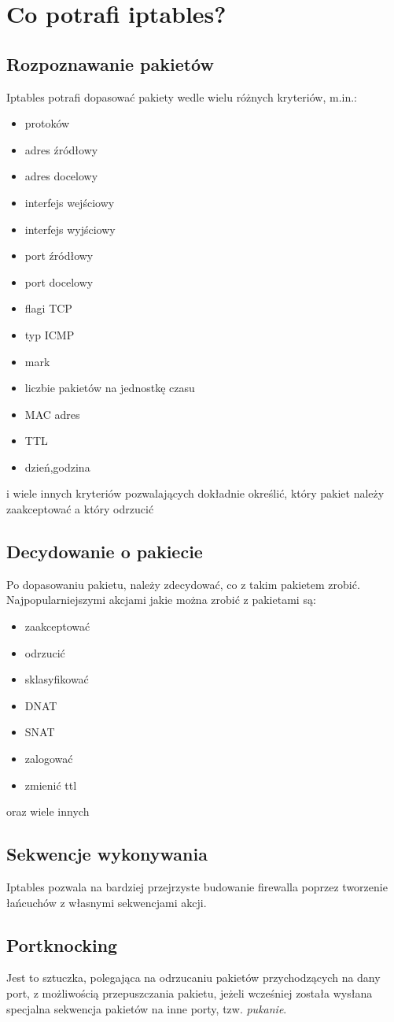 \documentclass[a4paper,12pt]{article}
\begin{document}
\section{Co potrafi iptables?}
\subsection{Rozpoznawanie pakietów}
Iptables potrafi dopasować pakiety wedle wielu różnych kryteriów, m.in.:
\begin{itemize}
\item protoków
\item adres źródłowy
\item adres docelowy
\item interfejs wejściowy
\item interfejs wyjściowy
\item port źródłowy
\item port docelowy
\item flagi TCP
\item typ ICMP
\item mark
\item liczbie pakietów na jednostkę czasu
\item MAC adres
\item TTL
\item dzień,godzina
\end{itemize}
i wiele innych kryteriów pozwalających dokładnie określić, który pakiet należy zaakceptować a który odrzucić
\subsection{Decydowanie o pakiecie}
Po dopasowaniu pakietu, należy zdecydować, co z takim pakietem zrobić. Najpopularniejszymi akcjami jakie można zrobić z pakietami są:
\begin{itemize}
\item zaakceptować
\item odrzucić
\item sklasyfikować
\item DNAT
\item SNAT
\item zalogować
\item zmienić ttl
\end{itemize}
oraz wiele innych
\subsection{Sekwencje wykonywania}
Iptables pozwala na bardziej przejrzyste budowanie firewalla poprzez tworzenie łańcuchów z własnymi sekwencjami akcji.
\subsection{Portknocking}
Jest to sztuczka, polegająca na odrzucaniu pakietów przychodzących na dany port, z możliwością przepuszczania pakietu, jeżeli wcześniej została wysłana specjalna sekwencja pakietów na inne porty, tzw. \textit{pukanie}.
\end{document}
